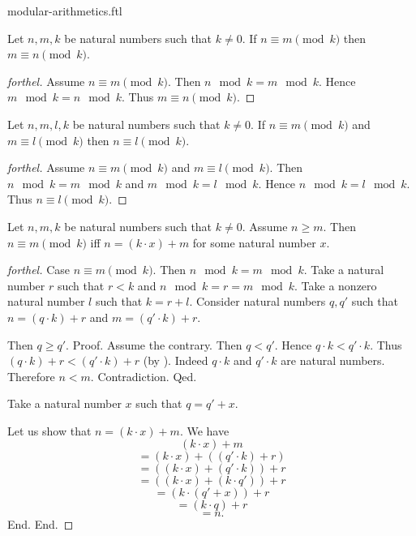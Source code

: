 \documentclass{naproche-library}
\begin{document}
\begin{smodule}{modular-arithmetics.ftl}
  \begin{proposition}[forthel,id=ARITHMETIC_08_2337210737098752]
    Let $n, m, k$ be natural numbers such that $k \neq 0$.
    If $n \equiv m \pmod{k}$ then $m \equiv n \pmod{k}$.
  \end{proposition}
  \begin{proof}[forthel]
    Assume $n \equiv m \pmod{k}$.
    Then $n \mod k = m \mod k$.
    Hence $m \mod k = n \mod k$.
    Thus $m \equiv n \pmod{k}$.
  \end{proof}

  \begin{proposition}[forthel,id=ARITHMETIC_08_7464329746055168]
    Let $n, m, l, k$ be natural numbers such that $k \neq 0$.
    If $n \equiv m \pmod{k}$ and $m \equiv l \pmod{k}$ then $n \equiv l \pmod{k}$.
  \end{proposition}
  \begin{proof}[forthel]
    Assume $n \equiv m \pmod{k}$ and $m \equiv l \pmod{k}$.
    Then $n \mod k = m \mod k$ and $m \mod k = l \mod k$.
    Hence $n \mod k = l \mod k$.
    Thus $n \equiv l \pmod{k}$.
  \end{proof}

  \begin{proposition}[forthel,id=ARITHMETIC_08_2034122983735296]
    Let $n, m, k$ be natural numbers such that $k \neq 0$.
    Assume $n \geq m$.
    Then $n \equiv m \pmod{k}$ iff $n = (k \cdot x) + m$ for some natural number $x$.
  \end{proposition}
  \begin{proof}[forthel]
    Case $n \equiv m \pmod{k}$.
      Then $n \mod k = m \mod k$.
      Take a natural number $r$ such that $r < k$ and $n \mod k = r = m \mod k$.
      Take a nonzero natural number $l$ such that $k = r + l$.
      Consider natural numbers $q,q'$ such that $n = (q \cdot k) + r$ and $m = (q' \cdot k) + r$.

      Then $q \geq q'$. \newline
      Proof.
        Assume the contrary.
        Then $q < q'$.
        Hence $q \cdot k < q' \cdot k$.
        Thus $(q \cdot k) + r < (q' \cdot k) + r$ (by ).
        Indeed $q \cdot k$ and $q' \cdot k$ are natural numbers.
        Therefore $n < m$.
        Contradiction.
      Qed.

      Take a natural number $x$ such that $q = q' + x$.

      Let us show that $n = (k \cdot x) + m$.
        We have
        \[  (k \cdot x) + m                       \]
        \[    = (k \cdot x) + ((q' \cdot k) + r)  \]
        \[    = ((k \cdot x) + (q' \cdot k)) + r  \]
        \[    = ((k \cdot x) + (k \cdot q')) + r  \]
        \[    = (k \cdot (q' + x)) + r            \]
        \[    = (k \cdot q) + r                   \]
        \[    = n.                                \]
      End.
    End.


\end{proof}
\end{smodule}
\end{document}

